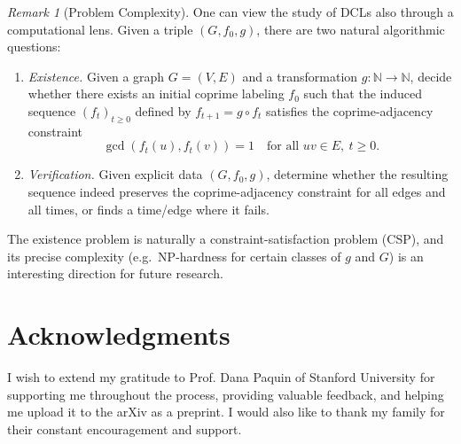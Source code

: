 \documentclass[12pt]{amsart}
\theoremstyle{plain}
\theoremstyle{definition}
\theoremstyle{remark}
\newtheorem{remark}[thm]{Remark}
\numberwithin{equation}{section}
\begin{document}
\begin{remark}[Problem Complexity]\label{rem:complexity}
One can view the study of DCLs also through a computational lens. Given a triple $(G,f_0,g)$, there are two natural algorithmic questions:
\begin{enumerate}
  \item \emph{Existence.} Given a graph $G=(V,E)$ and a transformation $g:\mathbb{N}\to\mathbb{N}$, decide whether there exists an initial coprime labeling $f_0$ such that the induced sequence $(f_t)_{t\ge0}$ defined by $f_{t+1}=g\circ f_t$ satisfies the coprime-adjacency constraint
  \[
  \gcd(f_t(u),f_t(v))=1\quad\text{for all }uv\in E,\ t\ge0.
  \]
  \item \emph{Verification.} Given explicit data $(G,f_0,g)$, determine whether the resulting sequence indeed preserves the coprime-adjacency constraint for all edges and all times, or finds a time/edge where it fails.
\end{enumerate}
The existence problem is naturally a constraint-satisfaction problem (CSP), and its precise complexity (e.g.\ NP-hardness for certain classes of $g$ and $G$) is an interesting direction for future research.
\end{remark}

\section*{Acknowledgments}
I wish to extend my gratitude to Prof. Dana Paquin of Stanford University for supporting me throughout the process, providing valuable feedback, and helping me upload it to the arXiv as a preprint. I would also like to thank my family for their constant encouragement and support.
\end{document}
